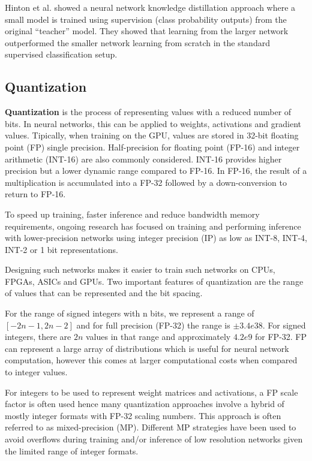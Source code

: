 Hinton et al. showed a neural network knowledge distillation approach where a small model is trained 
using supervision (class probability outputs) from the original “teacher” model. They showed that learning 
from the larger network outperformed the smaller network learning from scratch in the standard supervised 
classification setup.
\subsection{Quantization} 
\textbf{Quantization} is the process of representing values with a reduced number of bits. In 
neural networks, this can be applied to weights, activations and gradient values. Tipically, when 
training on the GPU, values are stored in 32-bit floating point (FP) single precision. Half-precision 
for floating point (FP-16) and integer arithmetic (INT-16) are also commonly considered. INT-16 provides
higher precision but a lower dynamic range compared to FP-16. In FP-16, the result of a multiplication 
is accumulated into a FP-32 followed by a down-conversion to return to FP-16.
    
To speed up training, faster inference and reduce bandwidth memory requirements, ongoing research 
has focused on training and performing inference with lower-precision networks using integer precision 
(IP) as low as INT-8, INT-4, INT-2 or 1 bit representations.
    
Designing such networks makes it easier to train such networks on CPUs, FPGAs, ASICs and GPUs. 
Two important features of quantization are the range of values that can be represented and the 
bit spacing.
    
For the range of signed integers with n bits, we represent a range of $[-2n-1, 2n-2]$ and for 
full precision (FP-32) the range is $\pm3.4e38$. For signed integers, there are $2n$ values in that 
range and approximately $4.2e9$ for FP-32. FP can represent a large array of distributions which is 
useful for neural network computation, however this comes at larger computational costs when compared 
to integer values.
    
For integers to be used to represent weight matrices and activations, a FP scale factor is often used 
hence many quantization approaches involve a hybrid of mostly integer formats with FP-32 scaling 
numbers. This approach is often referred to as mixed-precision (MP). Different MP strategies have 
been used to avoid overflows during training and/or inference of low resolution networks given the 
limited range of integer formats.

